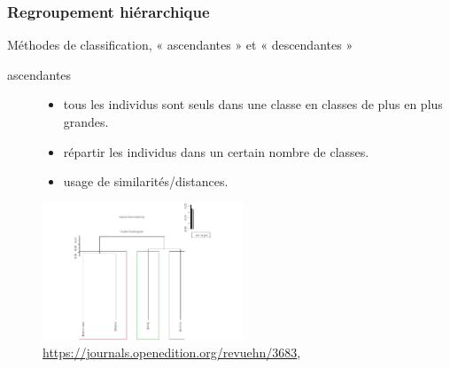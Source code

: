 \begin{frame}
  \frametitle{Regroupement hiérarchique}
 Méthodes de classification, « ascendantes » et « descendantes »  
 \begin{description} 
\item [ascendantes]
\begin{itemize}
\item {} tous les individus sont seuls dans une classe  en classes de plus en plus grandes. 
\item {} répartir les individus dans un certain nombre de classes.
\item {} usage de similarités/distances.
\end{itemize}
\end{description} 
 
\begin{figure}
  \includegraphics[width=6cm]{images/dendrogramme_img-3.jpg}
  \caption{\url{https://journals.openedition.org/revuehn/3683}, \cite{Melancon2023}}
  \end{figure}

  
\end{frame}

